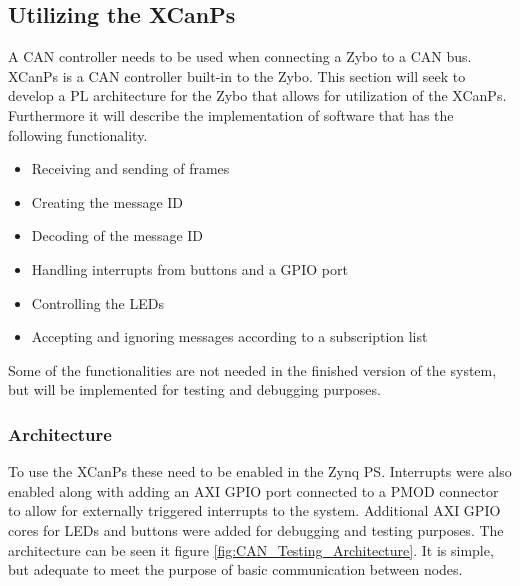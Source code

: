 \subsection{Utilizing the XCanPs}
\label{sub:TestingCANStack_BareMetal}
A CAN controller needs to be used when connecting a Zybo to a CAN bus.
XCanPs is a CAN controller built-in to the Zybo.
This section will seek to develop a PL architecture for the Zybo that allows for utilization of the XCanPs.
Furthermore it will describe the implementation of software that has the following functionality.
\begin{itemize}
\item Receiving and sending of frames
\item Creating the message ID
\item Decoding of the message ID
\item Handling interrupts from buttons and a GPIO port
\item Controlling the LEDs
\item Accepting and ignoring messages according to a subscription list
\end{itemize}
Some of the functionalities are not needed in the finished version of the system, but will be implemented for testing and debugging purposes.

\subsubsection*{Architecture}
To use the XCanPs these need to be enabled in the Zynq PS.
Interrupts were also enabled along with adding an AXI GPIO port connected to a PMOD connector to allow for externally triggered interrupts to the system.
Additional AXI GPIO cores for LEDs and buttons were added for debugging and testing purposes.
The architecture can be seen it figure \ref{fig:CAN_Testing_Architecture}. 
It is simple, but adequate to meet the purpose of basic communication between nodes.

